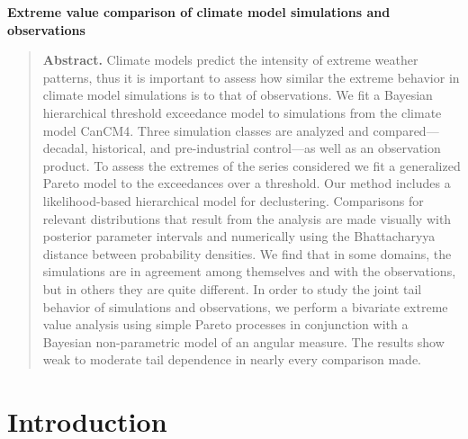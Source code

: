 \begin{Large}
\noindent \textbf{Extreme value comparison of climate model simulations and observations}
\end{Large}



\begin{quote}
\textbf{Abstract.}
Climate models predict the intensity of extreme weather patterns, thus it is important to assess how similar the extreme behavior in climate model simulations is to that of observations.
We fit a Bayesian hierarchical threshold exceedance model to simulations from the climate model CanCM4.
Three simulation classes are analyzed and compared---decadal, historical, and pre-industrial control---as well as an observation product. 
To assess the extremes of the series considered we fit a generalized Pareto model to the exceedances over a threshold.
Our method includes a likelihood-based hierarchical model for declustering.
Comparisons for relevant distributions that result from the analysis are made visually with posterior parameter intervals and numerically using the Bhattacharyya distance between probability densities.
We find that in some domains, the simulations are in agreement among themselves and with the observations, but in others they are quite different.
In order to study the joint tail behavior of simulations and observations, we perform a bivariate extreme value analysis using simple Pareto processes in conjunction with a Bayesian non-parametric model of an angular measure.
The results show weak to moderate tail dependence in nearly every comparison made.
\end{quote}


\section{Introduction}
\label{intro}


